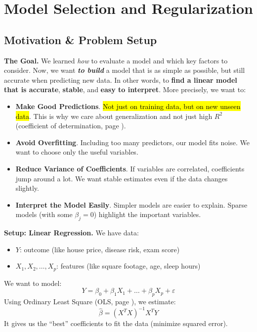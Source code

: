 \section{Model Selection and Regularization}

\subsection{Motivation \& Problem Setup}

\textcolor{Green3}{ \textbf{The Goal.}} We learned \emph{how} to evaluate a model and which key factors to consider. Now, we want \textbf{\emph{to build}} a model that is as simple as possible, but still accurate when predicting new data. In other words, to \textbf{find a linear model that is accurate}, \textbf{stable}, and \textbf{easy to interpret}. More precisely, we want to:
\begin{itemize}[label=\textcolor{Green3}{}]
    \item \textbf{Make Good Predictions}. \hl{Not just on training data, but on new unseen data}. This is why we care about generalization and not just high $R^{2}$ (coefficient of determination, page \pageref{eq: coefficient of determination}).
    \item \textbf{Avoid Overfitting}. Including too many predictors, our model fits noise. We want to choose only the useful variables.
    \item \textbf{Reduce Variance of Coefficients}. If variables are correlated, coefficients jump around a lot. We want stable estimates even if the data changes slightly.
    \item \textbf{Interpret the Model Easily}. Simpler models are easier to explain. Sparse models (with some $\beta_{j} = 0$) highlight the important variables.
\end{itemize}

\highspace
\textcolor{Green3}{ \textbf{Setup: Linear Regression.}} We have data:
\begin{itemize}
    \item $Y$: outcome (like house price, disease risk, exam score)
    \item $X_1, X_2, \dots, X_p$: features (like square footage, age, sleep hours)
\end{itemize}
We want to model:
\begin{equation*}
    Y = \beta_0 + \beta_1 X_1 + \dots + \beta_p X_p + \varepsilon
\end{equation*}
Using Ordinary Least Square (OLS, page \pageref{def: Ordinary Least Squares Estimation}), we estimate:
\begin{equation*}
    \hat{\beta} = \left(X^{T} X\right)^{-1} X^T Y
\end{equation*}
It gives us the ``best'' coefficients to fit the data (minimize squared error).


